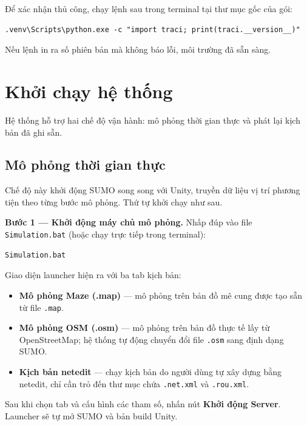 \documentclass[../DoAn.tex]{subfiles}
\begin{document}
Để xác nhận thủ công, chạy lệnh sau trong terminal tại thư mục gốc của gói:

\begin{lstlisting}[style=cmd]
.venv\Scripts\python.exe -c "import traci; print(traci.__version__)"
\end{lstlisting}

Nếu lệnh in ra số phiên bản mà không báo lỗi, môi trường đã sẵn sàng.

\section{Khởi chạy hệ thống}
\label{sec:pla-khoidong}

Hệ thống hỗ trợ hai chế độ vận hành: mô phỏng thời gian thực và phát lại
kịch bản đã ghi sẵn.

\subsection{Mô phỏng thời gian thực}
\label{subsec:pla-realtime}

Chế độ này khởi động SUMO song song với Unity, truyền dữ liệu vị trí phương
tiện theo từng bước mô phỏng. Thứ tự khởi chạy như sau.

\textbf{Bước 1 — Khởi động máy chủ mô phỏng.}
Nhấp đúp vào file \texttt{Simulation.bat}
(hoặc chạy trực tiếp trong terminal):

\begin{lstlisting}[style=cmd]
Simulation.bat
\end{lstlisting}

Giao diện launcher hiện ra với ba tab kịch bản:
\begin{itemize}
    \item \textbf{Mô phỏng Maze (.map)} — mô phỏng trên bản đồ mê cung
        được tạo sẵn từ file \texttt{.map}.
    \item \textbf{Mô phỏng OSM (.osm)} — mô phỏng trên bản đồ thực tế
        lấy từ OpenStreetMap; hệ thống tự động chuyển đổi file
        \texttt{.osm} sang định dạng SUMO.
    \item \textbf{Kịch bản netedit} — chạy kịch bản do người dùng
        tự xây dựng bằng netedit, chỉ cần trỏ đến thư mục chứa
        \texttt{.net.xml} và \texttt{.rou.xml}.
\end{itemize}
Sau khi chọn tab và cấu hình các tham số, nhấn nút \textbf{Khởi động Server}.
Launcher sẽ tự mở SUMO và bản build Unity.
\end{document}
